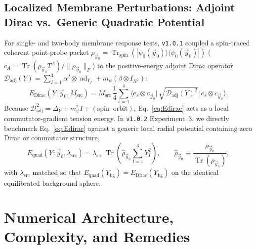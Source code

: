 \documentclass[11pt,a4paper]{article}
\DeclareMathOperator{\Tr}{Tr}
\begin{document}
\subsection{Localized Membrane Perturbations: Adjoint Dirac vs.\ Generic Quadratic Potential}
For single- and two-body membrane response tests, \texttt{v1.0.1} coupled a spin-traced coherent point-probe packet $\rho_{\vec{y}_0} = \Tr_{\mathrm{spin}}(|\psi_0(\vec{y}_0)\rangle\langle\psi_0(\vec{y}_0)|)$ ($c_A = \Tr(\rho_{\vec{y}_0}T^A)/\|\rho_{\vec{y}_0}\|_F$) to the positive-energy adjoint Dirac operator $\mathcal{D}_{\mathrm{adj}}(Y) = \sum_{I=1}^3 \alpha^I\otimes\operatorname{ad}_{Y_I} + m_\psi(\beta\otimes I_{N^2})$:
\begin{equation}
  E_{\mathrm{Dirac}}(Y; \vec{y}_0, M_{\mathrm{src}})
  = M_{\mathrm{src}}\,\frac{1}{4}\sum_{s=1}^{4} \bigl\langle e_s \otimes c_{\vec{y}_0} \big|\, \sqrt{\mathcal{D}_{\mathrm{adj}}(Y)^2} \,\big| e_s \otimes c_{\vec{y}_0} \bigr\rangle.
  \label{eq:Edirac}
\end{equation}
Because $\mathcal{D}_{\mathrm{adj}}^2 = \Delta_Y + m_\psi^2 I + (\text{spin--orbit})$, Eq.~\eqref{eq:Edirac} acts as a local commutator-gradient tension energy. In \texttt{v1.0.2} Experiment~3, we directly benchmark Eq.~\eqref{eq:Edirac} against a generic local radial potential containing zero Dirac or commutator structure,
\begin{equation}
  E_{\mathrm{quad}}(Y; \vec{y}_0, \lambda_{\mathrm{src}})
  = \lambda_{\mathrm{src}}\,\Tr\!\left(\hat{\rho}_{\vec{y}_0} \sum_{I=1}^{3} Y_I^2\right),
  \qquad \hat{\rho}_{\vec{y}_0} \equiv \frac{\rho_{\vec{y}_0}}{\Tr(\rho_{\vec{y}_0})},
  \label{eq:Equad}
\end{equation}
with $\lambda_{\mathrm{src}}$ matched so that $E_{\mathrm{quad}}(Y_{\mathrm{bg}}) = E_{\mathrm{Dirac}}(Y_{\mathrm{bg}})$ on the identical equilibrated background sphere.

\section{Numerical Architecture, Complexity, and Remedies}
\label{sec:methods}
\end{document}
